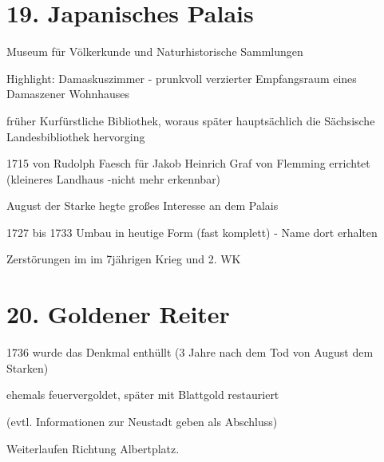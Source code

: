 \documentclass[a4paper,12pt]{report}
\begin{document}
\section{19. Japanisches Palais}
\begin{itemize*}
\item Museum für Völkerkunde und Naturhistorische Sammlungen
\item Highlight: Damaskuszimmer - prunkvoll verzierter Empfangsraum eines Damaszener Wohnhauses
\item früher Kurfürstliche Bibliothek, woraus später hauptsächlich die Sächsische Landesbibliothek hervorging
\item 1715 von Rudolph Faesch für Jakob Heinrich Graf von Flemming errichtet (kleineres Landhaus -nicht mehr erkennbar)
\item August der Starke hegte großes Interesse an dem Palais
\item 1727 bis 1733 Umbau in heutige Form (fast komplett) - Name dort erhalten
\item Zerstörungen im im 7jährigen Krieg und 2. WK
\end{itemize*}

\section{20. Goldener Reiter}
\begin{itemize*}
\item 1736 wurde das Denkmal enthüllt (3 Jahre nach dem Tod von August dem Starken)
\item ehemals feuervergoldet, später mit Blattgold restauriert
\item (evtl. Informationen zur Neustadt geben als Abschluss)
\end{itemize*}

Weiterlaufen Richtung Albertplatz.
\end{document}
